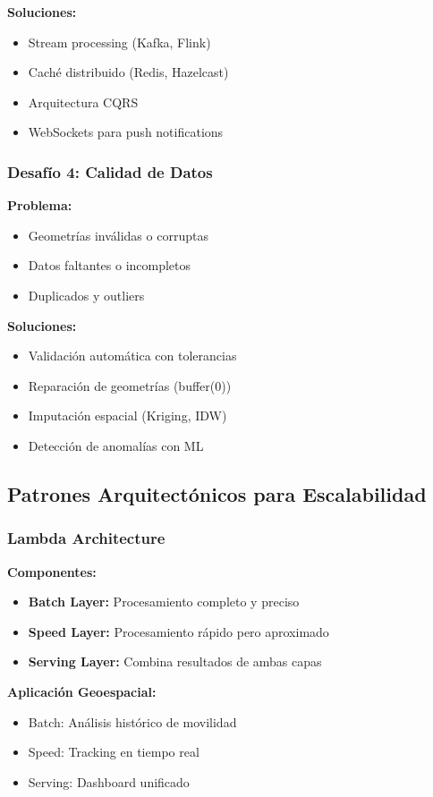 \documentclass[11pt,a4paper]{article}
\begin{document}
\textbf{Soluciones:}
\begin{itemize}
    \item Stream processing (Kafka, Flink)
    \item Caché distribuido (Redis, Hazelcast)
    \item Arquitectura CQRS
    \item WebSockets para push notifications
\end{itemize}

\subsubsection{Desafío 4: Calidad de Datos}
\textbf{Problema:}
\begin{itemize}
    \item Geometrías inválidas o corruptas
    \item Datos faltantes o incompletos
    \item Duplicados y outliers
\end{itemize}

\textbf{Soluciones:}
\begin{itemize}
    \item Validación automática con tolerancias
    \item Reparación de geometrías (buffer(0))
    \item Imputación espacial (Kriging, IDW)
    \item Detección de anomalías con ML
\end{itemize}

\subsection{Patrones Arquitectónicos para Escalabilidad}

\subsubsection{Lambda Architecture}
\textbf{Componentes:}
\begin{itemize}
    \item \textbf{Batch Layer:} Procesamiento completo y preciso
    \item \textbf{Speed Layer:} Procesamiento rápido pero aproximado
    \item \textbf{Serving Layer:} Combina resultados de ambas capas
\end{itemize}

\textbf{Aplicación Geoespacial:}
\begin{itemize}
    \item Batch: Análisis histórico de movilidad
    \item Speed: Tracking en tiempo real
    \item Serving: Dashboard unificado
\end{itemize}
\end{document}
